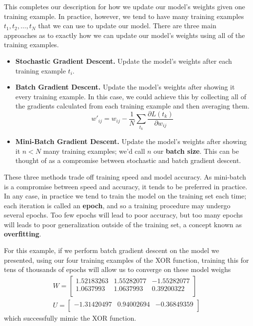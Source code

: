 \documentclass[12pt,letterpaper]{book}
\theoremstyle{definition}
\begin{document}
  This completes our description for how we update our model's weights given 
  one training example. In practice, however, we tend to have many training examples 
  $t_1, t_2, \dots, t_N$ that we can use to update our model. 
  There are three main approaches as to exactly how we can update our 
  model's weights using all of the training examples.
  \begin{itemize}
    \item \textbf{Stochastic Gradient Descent.} Update the model's weights after each training example $t_i$.
    \item\textbf{Batch Gradient Descent.} Update the model's weights after showing it every training example. 
    In this case, we could achieve this by collecting all of the gradients calculated from each 
    training example and then averaging them.
    \[
      w'_{ij}  = w_{ij} - \frac{1}{N} \sum_{t_k}\frac{\partial L(t_k)}{\partial w_{ij}}
    \]
    \item\textbf{Mini-Batch Gradient Descent.} Update the model's weights after showing it $n < N$ many training 
    examples; we'd call $n$ our \textbf{batch size}. 
    This can be thought of as a compromise between stochastic and batch gradient descent. 
  \end{itemize}
  These three methods trade off training speed and model accuracy. As mini-batch is a compromise 
  between speed and accuracy, it tends to be preferred in practice. In any case, 
  in practice we tend to train the model on the training set each time; each iteration is 
  called an \textbf{epoch}, and so a training procedure may undergo several epochs.
  Too few epochs will lead to poor accuracy, but too many epochs will leads to 
  poor generalization outside of the training set, a concept known as \textbf{overfitting}.

  For this example, if we perform batch gradient descent on the model we presented, using our 
  four training examples of the XOR function,
  training this for tens of thousands of epochs
  will allow us to converge on these model weighs 
  \begin{align}
    W = 
    \begin{bmatrix}
      1.52183263 & 1.55282077 & -1.55282077 \\
      1.0637993 & 1.0637993 & 0.39200322 \\
    \end{bmatrix}\\
    U = \begin{bmatrix}
      -1.31420497 & 0.94002694 & -0.36849359\\
    \end{bmatrix}
  \end{align}
  which successfully mimic the XOR function.
\end{document}
